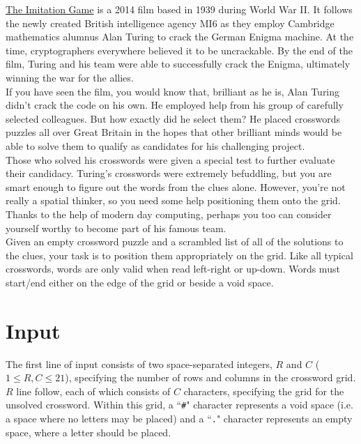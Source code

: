 

\noindent \href{https://www.imdb.com/title/tt2084970/}{The Imitation Game} is a 2014 film based in 1939 during World War II. It follows the newly created British intelligence agency MI6 as they employ Cambridge mathematics alumnus Alan Turing to crack the German Enigma machine. At the time, cryptographers everywhere believed it to be uncrackable. By the end of the film, Turing and his team were able to successfully crack the Enigma, ultimately winning the war for the allies.\\

If you have seen the film, you would know that, brilliant as he is, Alan Turing didn't crack the code on his own. He employed help from his group of carefully selected colleagues. But how exactly did he select them? He placed crosswords puzzles all over Great Britain in the hopes that other brilliant minds would be able to solve them to qualify as candidates for his challenging project.\\

Those who solved his crosswords were given a special test to further evaluate their candidacy. Turing's crosswords were extremely befuddling, but you are smart enough to figure out the words from the clues alone. However, you're not really a spatial thinker, so you need some help positioning them onto the grid. Thanks to the help of modern day computing, perhaps you too can consider yourself worthy to become part of his famous team.\\

Given an empty crossword puzzle and a scrambled list of all of the solutions to the clues, your task is to position them appropriately on the grid. Like all typical crosswords, words are only valid when read left-right or up-down. Words must start/end either on the edge of the grid or beside a void space.

\section*{Input}
The first line of input consists of two space-separated integers, $R$ and $C$ ($1 \leq R, C \leq 21$), specifying the number of rows and columns in the crossword grid.\\

\noindent $R$ line follow, each of which consists of $C$ characters, specifying the grid for the unsolved crossword. Within this grid, a ``\texttt{\#}" character represents a void space (i.e. a space where no letters may be placed) and a ``\texttt{.}" character represents an empty space, where a letter should be placed.\\

